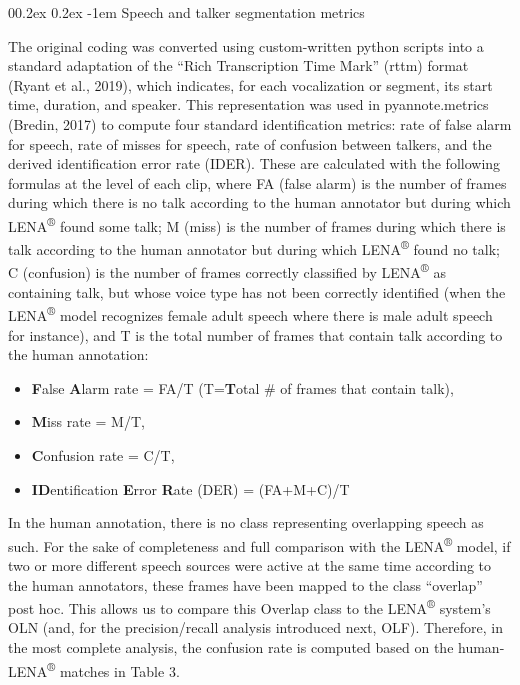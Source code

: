 \documentclass[english,table,man,floatsintext]{apa6}
\makeatletter
\providecommand{\tightlist}{%
  \setlength{\itemsep}{0pt}\setlength{\parskip}{0pt}}
\let\oldparagraph\paragraph
\renewcommand{\paragraph}[1]{\oldparagraph{#1}\mbox{}}
\renewcommand{\paragraph}{\@startsection{paragraph}{4}{\parindent}%
  {0\baselineskip \@plus 0.2ex \@minus 0.2ex}%
  {-1em}%
  {\normalfont\normalsize\bfseries\itshape\typesectitle}}
\makeatother
\begin{document}
\hypertarget{speech-and-talker-segmentation-metrics}{%
\paragraph{Speech and talker segmentation metrics}\label{speech-and-talker-segmentation-metrics}}

The original coding was converted using custom-written python scripts into a standard adaptation of the \enquote{Rich Transcription Time Mark} (rttm) format (Ryant et al., 2019), which indicates, for each vocalization or segment, its start time, duration, and speaker. This representation was used in pyannote.metrics (Bredin, 2017) to compute four standard identification metrics: rate of false alarm for speech, rate of misses for speech, rate of confusion between talkers, and the derived identification error rate (IDER). These are calculated with the following formulas at the level of each clip, where FA (false alarm) is the number of frames during which there is no talk according to the human annotator but during which LENA\textsuperscript{®} found some talk; M (miss) is the number of frames during which there is talk according to the human annotator but during which LENA\textsuperscript{®} found no talk; C (confusion) is the number of frames correctly classified by LENA\textsuperscript{®} as containing talk, but whose voice type has not been correctly identified (when the LENA\textsuperscript{®} model recognizes female adult speech where there is male adult speech for instance), and T is the total number of frames that contain talk according to the human annotation:

\begin{itemize}
\tightlist
\item
  \textbf{F}alse \textbf{A}larm rate = FA/T (T=\textbf{T}otal \# of frames that contain talk),
\item
  \textbf{M}iss rate = M/T,
\item
  \textbf{C}onfusion rate = C/T,
\item
  \textbf{ID}entification \textbf{E}rror \textbf{R}ate (DER) = (FA+M+C)/T
\end{itemize}

In the human annotation, there is no class representing overlapping speech as such. For the sake of completeness and full comparison with the LENA\textsuperscript{®} model, if two or more different speech sources were active at the same time according to the human annotators, these frames have been mapped to the class \enquote{overlap} post hoc. This allows us to compare this Overlap class to the LENA\textsuperscript{®} system's OLN (and, for the precision/recall analysis introduced next, OLF). Therefore, in the most complete analysis, the confusion rate is computed based on the human-LENA\textsuperscript{®} matches in Table 3.
\end{document}
